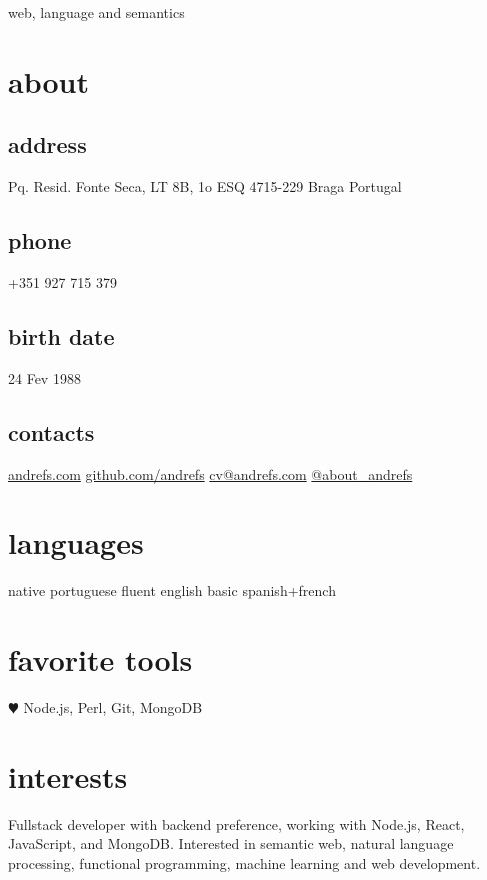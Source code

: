 \documentclass[a4paper]{friggeri-cv}
\begin{document}
       {web, language and semantics}



\begin{aside}
  \section{about}
\begin{sensitive}
    \subsection{address}
    {\small Pq. Resid. Fonte Seca,
    LT 8B, 1o ESQ
    4715-229 Braga
    Portugal}
    \subsection{phone}
    +351 927 715 379
    \subsection{birth date}
    24 Fev 1988
\end{sensitive}
    \subsection{contacts}
    \url{andrefs.com}
    \url{github.com/andrefs} \faGithub
    \href{mailto:cv@andrefs.com}{cv@andrefs.com} \faEnvelope
    \href{http://witter.com/about_andrefs}{@about\_andrefs} \faTwitter
  \section{languages}
    native portuguese
    fluent english
    basic spanish+french
  \section{favorite tools}
    {$\varheartsuit$} Node.js, Perl, Git, MongoDB
\end{aside}

\section{interests}
{Fullstack developer with backend preference, working with
Node.js, React, JavaScript, and MongoDB. Interested in semantic web, natural
language processing, functional programming,  machine learning and web development.}
\end{document}
